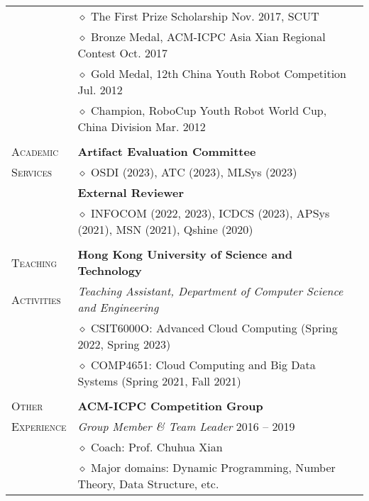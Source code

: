 \documentclass[letterpaper, 11pt]{article}
\begin{document}
\begin{longtable}{p{1in}p{5in}}
& $\diamond$ The First Prize Scholarship \hfill Nov. 2017, SCUT \\

& $\diamond$ Bronze Medal, ACM-ICPC Asia Xian Regional Contest \hfill Oct. 2017 \\

& $\diamond$ Gold Medal, 12th China Youth Robot Competition \hfill Jul. 2012 \\

& $\diamond$ Champion, RoboCup Youth Robot World Cup, China Division \hfill Mar. 2012 \\

& \\

{\textsc{Academic}}
& \textbf{Artifact Evaluation Committee} \\
{\textsc{Services}}
& $\diamond$ OSDI (2023), ATC (2023), MLSys (2023) \\
& \textbf{External Reviewer} \\
& $\diamond$ INFOCOM (2022, 2023), ICDCS (2023), APSys (2021), MSN (2021), Qshine (2020) \\
& \\

{\textsc{Teaching }}
& \textbf{Hong Kong University of Science and Technology} \\
{\textsc{Activities}}
& \textit{Teaching Assistant, Department of Computer Science and Engineering} \\
& $\diamond$ CSIT6000O: Advanced Cloud Computing (Spring 2022, Spring 2023) \\
& $\diamond$ COMP4651: Cloud Computing and Big Data Systems (Spring 2021, Fall 2021) \\
& \\

{\textsc{Other}}
& \textbf{ACM-ICPC Competition Group} \\
{\textsc{Experience}}
& \textit{Group Member \& Team Leader} \hfill 2016 -- 2019 \\
& $\diamond$ Coach: Prof. Chuhua Xian \\
& $\diamond$ Major domains: Dynamic Programming, Number Theory, Data Structure, etc. \\


\end{longtable}
\end{document}
